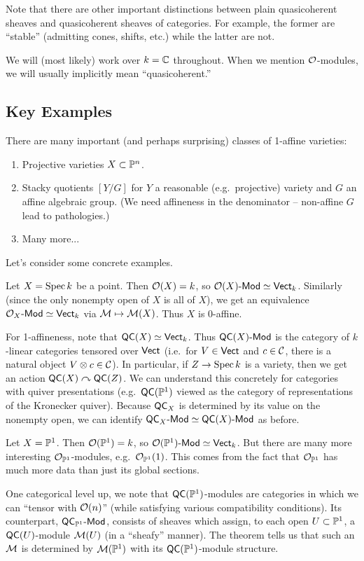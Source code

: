 \documentclass{article}
\begin{document}
Note that there are other important distinctions between plain quasicoherent sheaves and quasicoherent sheaves of categories.
For example, the former are ``stable'' (admitting cones, shifts, etc.) while the latter are not.

We will (most likely) work over $k = \mathbb{C}$ throughout.
When we mention $\mathcal{O}$-modules, we will usually implicitly mean ``quasicoherent.''

\subsection{Key Examples}

There are many important (and perhaps surprising) classes of 1-affine varieties:

\begin{enumerate}
	\item Projective varieties $X \subset \mathbb{P}^n$.
	\item Stacky quotients $[Y / G]$ for $Y$ a reasonable (e.g.\ projective) variety and $G$ an affine algebraic group. (We need affineness in the denominator -- non-affine $G$ lead to pathologies.)
	\item Many more...
\end{enumerate}

Let's consider some concrete examples.

\begin{ex}
	Let $X = \operatorname{Spec} k$ be a point.
	Then $\mathcal{O}(X) = k$, so $\mathcal{O}(X)\text{-}\mathsf{Mod} \simeq \mathsf{Vect}_k$.
	Similarly (since the only nonempty open of $X$ is all of $X$), we get an equivalence $\mathcal{O}_X\text{-}\mathsf{Mod} \simeq \mathsf{Vect}_k$ via $\mathcal{M} \mapsto \mathcal{M}(X)$.
	Thus $X$ is 0-affine.

	For 1-affineness, note that $\mathsf{QC}(X) \simeq \mathsf{Vect}_k$.
	Thus $\mathsf{QC}(X)\text{-}\mathsf{Mod}$ is the category of $k$-linear categories tensored over $\mathsf{Vect}$ (i.e.\ for $V \in \mathsf{Vect}$ and $c \in \mathcal{C}$, there is a natural object $V \otimes c \in \mathcal{C}$).
	In particular, if $Z \to \operatorname{Spec} k$ is a variety, then we get an action $\mathsf{QC}(X) \curvearrowright \mathsf{QC}(Z)$.
	We can understand this concretely for categories with quiver presentations (e.g.\ $\mathsf{QC}(\mathbb{P}^1)$ viewed as the category of representations of the Kronecker quiver).
	Because $\mathsf{QC}_X$ is determined by its value on the nonempty open, we can identify $\mathsf{QC}_X\text{-}\mathsf{Mod} \simeq \mathsf{QC}(X)\text{-}\mathsf{Mod}$ as before.
\end{ex}

\begin{ex}
	Let $X = \mathbb{P}^1$.
	Then $\mathcal{O}(\mathbb{P}^1) = k$, so $\mathcal{O}(\mathbb{P}^1)\text{-}\mathsf{Mod} \simeq \mathsf{Vect}_k$.
	But there are many more interesting $\mathcal{O}_{\mathbb{P}^1}$-modules, e.g.\ $\mathcal{O}_{\mathbb{P}^1}(1)$.
	This comes from the fact that $\mathcal{O}_{\mathbb{P}^1}$ has much more data than just its global sections.

	One categorical level up, we note that $\mathsf{QC}(\mathbb{P}^1)$-modules are categories in which we can ``tensor with $\mathcal{O}(n)$'' (while satisfying various compatibility conditions).
	Its counterpart, $\mathsf{QC}_{\mathbb{P}^1}\text{-}\mathsf{Mod}$, consists of sheaves which assign, to each open $U \subset \mathbb{P}^1$, a $\mathsf{QC}(U)$-module $\mathcal{M}(U)$ (in a ``sheafy'' manner).
	The theorem tells us that such an $\mathcal{M}$ is determined by $\mathcal{M}(\mathbb{P}^1)$ with its $\mathsf{QC}(\mathbb{P}^1)$-module structure.
\end{ex}
\end{document}
